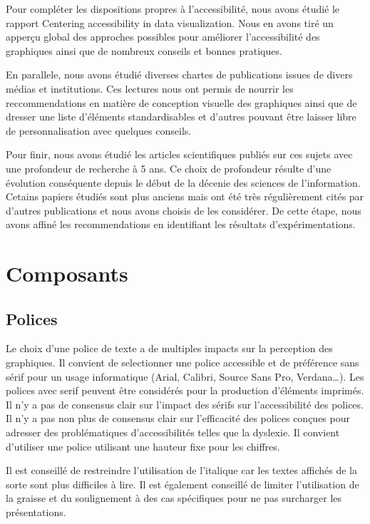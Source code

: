 \documentclass[a4paper,12pt]{article}
\begin{document}
\begin{multicols}{2}
Pour compléter les dispositions propres à l'accessibilité, nous avons étudié le rapport \og Centering accessibility in data visualization\fg{}. \autocite{schwabishCenteringAccessibilityData2022} Nous en avons tiré un apperçu global des approches possibles pour améliorer l'accessibilité des graphiques ainsi que de nombreux conseils et bonnes pratiques.

En parallele, nous avons étudié diverses chartes de publications issues de divers médias et institutions. Ces lectures nous ont permis de nourrir les reccommendations en matière de conception visuelle des graphiques ainsi que de dresser une liste d'éléments standardisables et d'autres pouvant être laisser libre de personnalisation avec quelques conseils.

Pour finir, nous avons étudié les articles scientifiques publiés sur ces sujets avec une profondeur de recherche à 5 ans. Ce choix de profondeur résulte d'une évolution conséquente depuis le début de la décenie des sciences de l'information. Cetains papiers étudiés sont plus anciens mais ont été très régulièrement cités par d'autres publications et nous avons choisis de les considérer. De cette étape, nous avons affiné les recommendations en identifiant les résultats d'expérimentations.
\section*{Composants}
\label{sec:org1b18c7c}
\subsection*{Polices}
\label{sec:org420c809}
Le choix d'une police de texte a de multiples impacts sur la perception des graphiques. Il convient de selectionner une police accessible et de préférence sans sérif pour un usage informatique (Arial, Calibri, Source Sans Pro, Verdana\ldots{}). \autocite{andreaskrauseBestPracticesData2024} Les polices avec serif peuvent être considérés pour la production d'éléments imprimés. Il n'y a pas de consensus clair sur l'impact des sérifs sur l'accessibilité des polices. \autocite{stephenfewTableDesign2012} Il n'y a pas non plus de consensus clair sur l'efficacité des polices conçues pour adresser des problématiques d'accessibilités telles que la dyslexie. Il convient d'utiliser une police utilisant une hauteur fixe pour les chiffres. \autocite{stephenfewTableDesign2012}

Il est conseillé de restreindre l'utilisation de l'italique car les textes affichés de la sorte sont plus difficiles à lire. Il est également conseillé de limiter l'utilisation de la graisse et du soulignement à des cas spécifiques pour ne pas surcharger les présentations.


\end{multicols}
\end{document}
